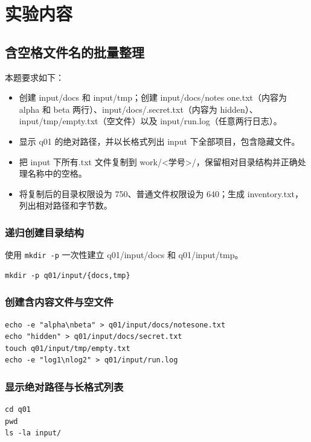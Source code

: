 \section{实验内容}

\subsection{含空格文件名的批量整理}
本题要求如下：
\begin{itemize}
    \item 创建 input/docs 和 input/tmp；创建 input/docs/notes one.txt（内容为 alpha 和 beta 两行）、input/docs/.secret.txt（内容为 hidden）、input/tmp/empty.txt（空文件）以及 input/run.log（任意两行日志）。
    \item 显示 q01 的绝对路径，并以长格式列出 input 下全部项目，包含隐藏文件。
    \item 把 input 下所有.txt 文件复制到 work/<学号>/，保留相对目录结构并正确处理名称中的空格。
    \item 将复制后的目录权限设为 750、普通文件权限设为 640；生成 inventory.txt，列出相对路径和字节数。
\end{itemize}

\subsubsection*{递归创建目录结构}
使用 \texttt{mkdir -p} 一次性建立 q01/input/docs 和 q01/input/tmp。
\begin{verbatim}
mkdir -p q01/input/{docs,tmp}
\end{verbatim}

\subsubsection*{创建含内容文件与空文件}
\begin{verbatim}
echo -e "alpha\nbeta" > q01/input/docs/notesone.txt
echo "hidden" > q01/input/docs/secret.txt
touch q01/input/tmp/empty.txt
echo -e "log1\nlog2" > q01/input/run.log
\end{verbatim}

\subsubsection*{显示绝对路径与长格式列表}
\begin{verbatim}
cd q01
pwd
ls -la input/
\end{verbatim}

